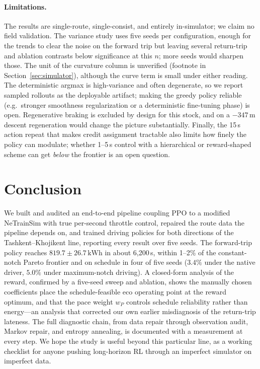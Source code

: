 \documentclass[11pt,a4paper]{article}
\newcommand{\kwh}{\,\text{kWh}}   %
\begin{document}
\paragraph{Limitations.} The results are single-route, single-consist,
and entirely in-simulator; we claim no field validation. The variance study
uses five seeds per configuration, enough for the trends to clear the noise
on the forward trip but leaving several return-trip and ablation contrasts
below significance at this $n$; more seeds would sharpen those. The unit of
the curvature column is unverified (footnote in
Section~\ref{sec:simulator}), although the curve term is small under either
reading. The deterministic argmax is high-variance and often degenerate, so
we report sampled rollouts as the deployable artifact; making the greedy
policy reliable (e.g.\ stronger smoothness regularization or a deterministic
fine-tuning phase) is open. Regenerative braking is excluded by design for
this stock, and on a $-347$\,m descent regeneration would change the picture
substantially. Finally, the 15\,s action repeat that makes credit assignment
tractable also limits how finely the policy can modulate; whether 1--5\,s
control with a hierarchical or reward-shaped scheme can get \emph{below} the
frontier is an open question.

\section{Conclusion}
\label{sec:conclusion}

We built and audited an end-to-end pipeline coupling PPO to a modified
NeTrainSim with true per-second throttle control, repaired the route data
the pipeline depends on, and trained driving policies for both directions
of the Tashkent--Khojikent line, reporting every result over five seeds.
The forward-trip policy reaches $819.7\pm26.7\kwh$ in about 6{,}200\,s,
within 1--2\% of the constant-notch Pareto frontier and on schedule in four
of five seeds ($3.4\%$ under the native driver, $5.0\%$ under maximum-notch
driving). A closed-form analysis of the reward, confirmed by a five-seed
sweep and ablation, shows the manually chosen coefficients place the
schedule-feasible eco operating point at the reward optimum, and that the
pace weight $w_P$ controls schedule reliability rather than energy---an
analysis that corrected our own earlier misdiagnosis of the return-trip
lateness. The full diagnostic chain, from data repair through observation
audit, Markov repair, and entropy annealing, is documented with a
measurement at every step. We hope the study is useful beyond this
particular line, as a working checklist for anyone pushing long-horizon RL
through an imperfect simulator on imperfect data.
\end{document}
